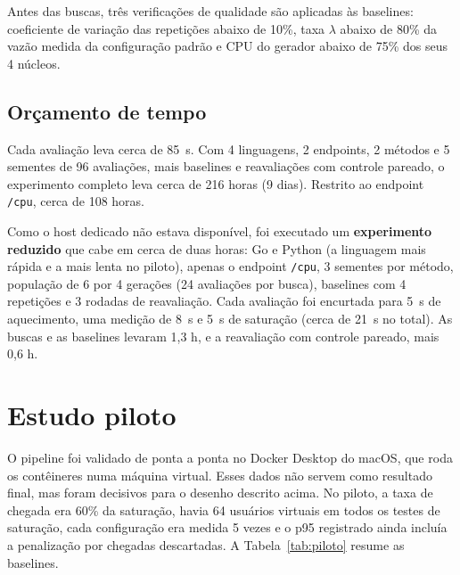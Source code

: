 \documentclass[11pt,a4paper]{article}
\begin{document}
Antes das buscas, três verificações de qualidade são aplicadas às baselines: coeficiente de variação das repetições
abaixo de 10\%, taxa $\lambda$ abaixo de 80\% da vazão medida da configuração padrão e CPU do gerador abaixo de 75\% dos seus 4 núcleos.

\subsection{Orçamento de tempo}
\label{sec:metodologia-reduzida}

Cada avaliação leva cerca de \SI{85}{s}. Com 4 linguagens, 2 endpoints, 2 métodos e 5 sementes de 96 avaliações,
mais baselines e reavaliações com controle pareado, o experimento completo leva cerca de 216 horas (9 dias).
Restrito ao endpoint \texttt{/cpu}, cerca de 108 horas.

Como o host dedicado não estava disponível, foi executado um \textbf{experimento reduzido} que cabe em cerca de duas horas:
Go e Python (a linguagem mais rápida e a mais lenta no piloto), apenas o endpoint \texttt{/cpu}, 3 sementes por método,
população de 6 por 4 gerações (24 avaliações por busca), baselines com 4 repetições e 3 rodadas de reavaliação. Cada
avaliação foi encurtada para \SI{5}{s} de aquecimento, uma medição de \SI{8}{s} e \SI{5}{s} de saturação (cerca de
\SI{21}{s} no total). As buscas e as baselines levaram 1,3 h, e a reavaliação com controle pareado, mais 0,6 h.

\section{Estudo piloto}

O pipeline foi validado de ponta a ponta no Docker Desktop do macOS, que roda os contêineres numa máquina virtual.
Esses dados não servem como resultado final, mas foram decisivos para o desenho descrito acima. No piloto, a taxa
de chegada era 60\% da saturação, havia 64 usuários virtuais em todos os testes de saturação, cada configuração era
medida 5 vezes e o p95 registrado ainda incluía a penalização por chegadas descartadas. A Tabela~\ref{tab:piloto}
resume as baselines.
\end{document}

